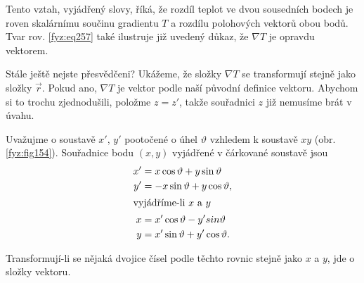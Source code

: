 {    Tento vztah, vyjádřený slovy, říká, že rozdíl teplot ve dvou sousedních bodech je roven 
    skalárnímu součinu gradientu $T$ a rozdílu polohových vektorů obou bodů. Tvar rov. 
    \ref{fyz:eq257} také ilustruje již uvedený důkaz, že  $\nabla T$ je opravdu vektorem.

    Stále ještě nejste přesvědčeni? Ukážeme, že složky $\nabla T$ se transformují stejně jako 
    složky $\vec{r}$. Pokud ano, $\nabla T$ je vektor podle naší původní definice vektoru. Abychom 
    si to trochu zjednodušili, položme $z=z'$, takže souřadnici $z$ již nemusíme brát v úvahu.

    Uvažujme o soustavě $x'$, $y'$ pootočené o úhel $\vartheta$  vzhledem k soustavě $xy$ (obr.
    \ref{fyz:fig154}). Souřadnice bodu $(x,y)$ vyjádřené v čárkované soustavě jsou
    \begin{align}
      x' &=  x\cos\vartheta+y\sin\vartheta    \nonumber           \\
      y' &= -x\sin\vartheta+y\cos\vartheta,   \nonumber           \\ 
      \shortintertext{vyjádříme-li $x$ a $y$}
      x  &= x'\cos\vartheta-y'sin\vartheta    \label{fyz:eq253}\\
      y  &= x'\sin\vartheta+y'\cos\vartheta.  \nonumber
    \end{align}

    Transformují-li se nějaká dvojice čísel podle těchto rovnic stejně jako $x$ a $y$, jde o složky vektoru.

}
